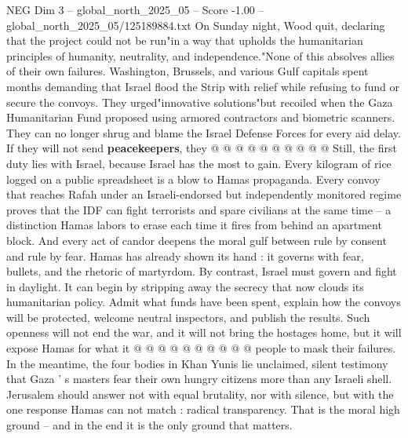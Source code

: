 \begin{textsample}{NEG Dim 3 – global\_north\_2025\_05 – Score -1.00 – global\_north\_2025\_05/125189884.txt}
On Sunday night, Wood quit, declaring that the project could not be run"in a way that upholds the humanitarian principles of humanity, neutrality, and independence."None of this absolves allies of their own failures.
Washington, Brussels, and various Gulf capitals spent months demanding that Israel flood the Strip with relief while refusing to fund or secure the convoys.
They urged"innovative solutions"but recoiled when the Gaza Humanitarian Fund proposed using armored contractors and biometric scanners.
They can no longer shrug and blame the Israel Defense Forces for every aid delay.
If they will not send \textbf{peacekeepers}, they @ @ @ @ @ @ @ @ @ @ Still, the first duty lies with Israel, because Israel has the most to gain.
Every kilogram of rice logged on a public spreadsheet is a blow to Hamas propaganda.
Every convoy that reaches Rafah under an Israeli-endorsed but independently monitored regime proves that the IDF can fight terrorists and spare civilians at the same time -- a distinction Hamas labors to erase each time it fires from behind an apartment block.
And every act of candor deepens the moral gulf between rule by consent and rule by fear.
Hamas has already shown its hand : it governs with fear, bullets, and the rhetoric of martyrdom.
By contrast, Israel must govern and fight in daylight.
It can begin by stripping away the secrecy that now clouds its humanitarian policy.
Admit what funds have been spent, explain how the convoys will be protected, welcome neutral inspectors, and publish the results.
Such openness will not end the war, and it will not bring the hostages home, but it will expose Hamas for what it @ @ @ @ @ @ @ @ @ @ people to mask their failures.
In the meantime, the four bodies in Khan Yunis lie unclaimed, silent testimony that Gaza ' s masters fear their own hungry citizens more than any Israeli shell.
Jerusalem should answer not with equal brutality, nor with silence, but with the one response Hamas can not match : radical transparency.
That is the moral high ground -- and in the end it is the only ground that matters.

\end{textsample}
